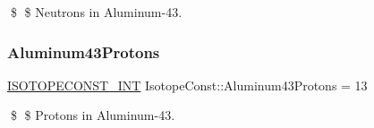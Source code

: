 \$ \$ Neutrons in Aluminum-\/43. \mbox{\label{group___isotope_const-_aluminum-_al43_ga8665794ac3a2f08554ed0d8eabcb426a}} 
\subsubsection{\texorpdfstring{Aluminum43\+Protons}{Aluminum43Protons}}
{\footnotesize\ttfamily \mbox{\hyperlink{group___isotope_const-_macros_ga5f18360b3e99483a35c32d789e62621c}{I\+S\+O\+T\+O\+P\+E\+C\+O\+N\+S\+T\+\_\+\+I\+NT}} Isotope\+Const\+::\+Aluminum43\+Protons = 13}

\$ \$ Protons in Aluminum-\/43. 